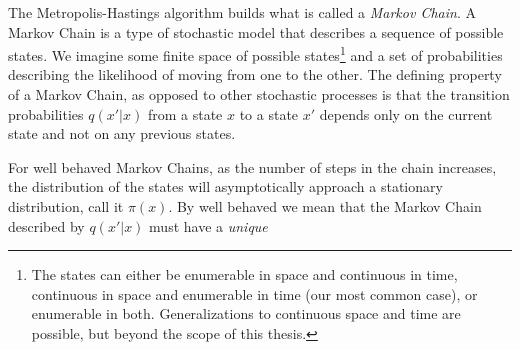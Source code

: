 \documentclass[Thesis.tex]{subfiles}
\begin{document}
The Metropolis-Hastings algorithm builds what is called a \emph{Markov Chain}. A
Markov Chain is a type of stochastic model that describes a sequence of possible
states. We imagine some finite space of possible states\footnote{The states can
either be enumerable in space and continuous in time, continuous in space and
enumerable in time (our most common case), or enumerable in both.
Generalizations to continuous space and time are possible, but beyond the scope
of this thesis.} and a set of probabilities describing the likelihood of moving
from one to the other. The defining property of a Markov Chain, as opposed to
other stochastic processes is that the transition probabilities $q(x'|x)$ from a
state $x$ to a state $x'$ depends only on the current state and not on any
previous states.

For well behaved Markov Chains, as the number of steps in the chain increases,
the distribution of the states will asymptotically approach a stationary
distribution, call it $\pi(x)$. By well behaved we mean that the Markov Chain
described by $q(x'|x)$ must have a \emph{unique}
\end{document}
